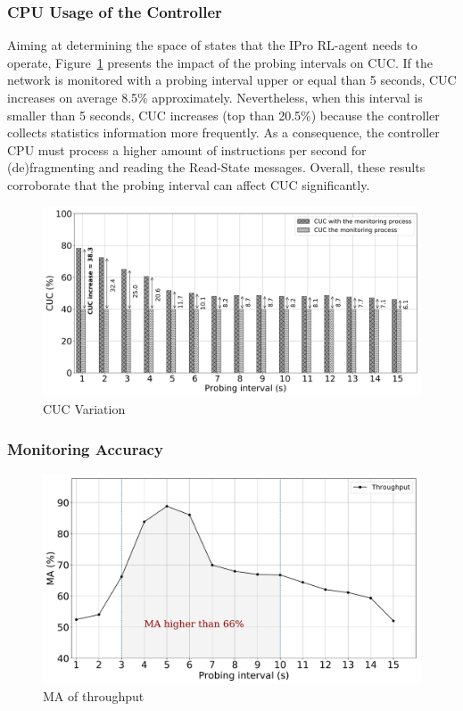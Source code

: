 \subsubsection{CPU Usage of the Controller}
Aiming at determining the space of states that the IPro RL-agent needs to operate, Figure~\ref{fig:cpu_behavior} presents the impact of the probing intervals on CUC. If the network is monitored with a probing interval upper or equal than 5 seconds, CUC increases on average 8.5\% approximately. Nevertheless, when this interval is smaller than 5 seconds, CUC increases (top than 20.5\%) because the controller collects statistics information more frequently. As a consequence, the controller CPU must process a higher amount of instructions per second for (de)fragmenting and reading the Read-State messages. Overall, these results corroborate that the probing interval can affect CUC significantly.

\begin{figure}[h!]
    \centering
    \includegraphics[width=1.0\columnwidth]{figures/Fig6-cpu-usage}
    \caption{CUC Variation}
    \label{fig:cpu_behavior}
\end{figure}

\subsubsection{Monitoring Accuracy}

\begin{figure}[h!]
    \centering
    \includegraphics[width=1.0\columnwidth]{figures/Fig9-throughput}
    \caption{MA of throughput }
    \label{fig:throughput}
\end{figure}


